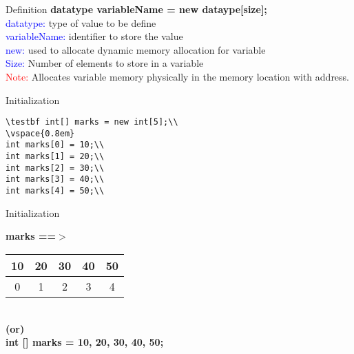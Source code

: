 \documentclass[aspectratio=169,14pt,usenames,dvipsnames]{beamer}
\begin{document}
\begin{frame}{Definition}
\textbf{datatype variableName = new dataype[size];}\\
\vspace{0.5em}
\textcolor{blue}{datatype:} type of value to be define\\
\vspace{0.5em}
\textcolor{blue}{variableName:} identifier to store the value\\
\vspace{0.5em}
\textcolor{blue}{new:} used to allocate dynamic memory allocation for variable\\
\vspace{0.5em}
\textcolor{blue}{Size:} Number of elements to store in a variable\\
\vspace{0.8em}
\textcolor{red}{Note:} Allocates variable memory physically in the
memory location with address.
\end{frame}

\begin{frame}{Initialization}
\begin{center}
\begin{lstlisting}
\testbf int[] marks = new int[5];\\ 
\vspace{0.8em}
int marks[0] = 10;\\
int marks[1] = 20;\\
int marks[2] = 30;\\
int marks[3] = 40;\\
int marks[4] = 50;\\
\end{lstlisting}
\end{center}
\end{frame}

\begin{frame}{Initialization}
\begin{center}
\textbf{marks  ==$>$}
\begin{tabular}{|c|c|c|c|c|}
\hline
     10 & 20 & 30 & 40 & 50 \\
\hline
    0 & 1 & 2 & 3 & 4\\
\hline
\end{tabular}\\
\vspace{0.8em}
\textbf{(or)}\\
\vspace{0.8em}
\textbf{int [] marks = {10, 20, 30, 40, 50};}
\end{center}
\end{frame}
\end{document}
